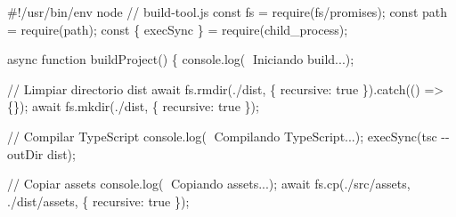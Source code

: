\documentclass[
  11pt,
  letterpaper,
  oneside,
  openany]{scrbook}
\newenvironment{Shaded}{}{}
\newcommand{\BuiltInTok}[1]{\textcolor[rgb]{0.84,0.23,0.29}{#1}}
\newcommand{\CommentTok}[1]{\textcolor[rgb]{0.42,0.45,0.49}{#1}}
\newcommand{\ControlFlowTok}[1]{\textcolor[rgb]{0.84,0.23,0.29}{#1}}
\newcommand{\DataTypeTok}[1]{\textcolor[rgb]{0.84,0.23,0.29}{#1}}
\newcommand{\FunctionTok}[1]{\textcolor[rgb]{0.44,0.26,0.76}{#1}}
\newcommand{\KeywordTok}[1]{\textcolor[rgb]{0.84,0.23,0.29}{#1}}
\newcommand{\NormalTok}[1]{\textcolor[rgb]{0.14,0.16,0.18}{#1}}
\newcommand{\OperatorTok}[1]{\textcolor[rgb]{0.14,0.16,0.18}{#1}}
\newcommand{\PreprocessorTok}[1]{\textcolor[rgb]{0.84,0.23,0.29}{#1}}
\newcommand{\StringTok}[1]{\textcolor[rgb]{0.01,0.18,0.38}{#1}}
\begin{document}
\begin{Shaded}
\begin{Highlighting}[]
\CommentTok{\#!/usr/bin/env node}
\CommentTok{// build{-}tool.js}
\KeywordTok{const}\NormalTok{ fs }\OperatorTok{=} \PreprocessorTok{require}\NormalTok{(}\StringTok{\textquotesingle{}fs/promises\textquotesingle{}}\NormalTok{)}\OperatorTok{;}
\KeywordTok{const}\NormalTok{ path }\OperatorTok{=} \PreprocessorTok{require}\NormalTok{(}\StringTok{\textquotesingle{}path\textquotesingle{}}\NormalTok{)}\OperatorTok{;}
\KeywordTok{const}\NormalTok{ \{ execSync \} }\OperatorTok{=} \PreprocessorTok{require}\NormalTok{(}\StringTok{\textquotesingle{}child\_process\textquotesingle{}}\NormalTok{)}\OperatorTok{;}

\KeywordTok{async} \KeywordTok{function} \FunctionTok{buildProject}\NormalTok{() \{}
    \BuiltInTok{console}\OperatorTok{.}\FunctionTok{log}\NormalTok{(}\StringTok{\textquotesingle{}🚀 Iniciando build...\textquotesingle{}}\NormalTok{)}\OperatorTok{;}
    
    \CommentTok{// Limpiar directorio dist}
    \ControlFlowTok{await}\NormalTok{ fs}\OperatorTok{.}\FunctionTok{rmdir}\NormalTok{(}\StringTok{\textquotesingle{}./dist\textquotesingle{}}\OperatorTok{,}\NormalTok{ \{ }\DataTypeTok{recursive}\OperatorTok{:} \KeywordTok{true}\NormalTok{ \})}\OperatorTok{.}\FunctionTok{catch}\NormalTok{(() }\KeywordTok{=\textgreater{}}\NormalTok{ \{\})}\OperatorTok{;}
    \ControlFlowTok{await}\NormalTok{ fs}\OperatorTok{.}\FunctionTok{mkdir}\NormalTok{(}\StringTok{\textquotesingle{}./dist\textquotesingle{}}\OperatorTok{,}\NormalTok{ \{ }\DataTypeTok{recursive}\OperatorTok{:} \KeywordTok{true}\NormalTok{ \})}\OperatorTok{;}
    
    \CommentTok{// Compilar TypeScript}
    \BuiltInTok{console}\OperatorTok{.}\FunctionTok{log}\NormalTok{(}\StringTok{\textquotesingle{}📝 Compilando TypeScript...\textquotesingle{}}\NormalTok{)}\OperatorTok{;}
    \FunctionTok{execSync}\NormalTok{(}\StringTok{\textquotesingle{}tsc {-}{-}outDir dist\textquotesingle{}}\NormalTok{)}\OperatorTok{;}
    
    \CommentTok{// Copiar assets}
    \BuiltInTok{console}\OperatorTok{.}\FunctionTok{log}\NormalTok{(}\StringTok{\textquotesingle{}📁 Copiando assets...\textquotesingle{}}\NormalTok{)}\OperatorTok{;}
    \ControlFlowTok{await}\NormalTok{ fs}\OperatorTok{.}\FunctionTok{cp}\NormalTok{(}\StringTok{\textquotesingle{}./src/assets\textquotesingle{}}\OperatorTok{,} \StringTok{\textquotesingle{}./dist/assets\textquotesingle{}}\OperatorTok{,}\NormalTok{ \{ }\DataTypeTok{recursive}\OperatorTok{:} \KeywordTok{true}\NormalTok{ \})}\OperatorTok{;}
    

\end{Highlighting}
\end{Shaded}
\end{document}
